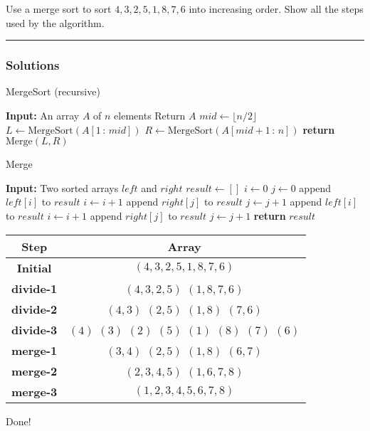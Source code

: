 \newpage
\begin{question}
Use a merge sort to sort $4,3,2,5,1,8,7,6$ into increasing order. Show all the steps used by the algorithm.
\end{question}

\par\noindent\rule{\textwidth}{0.5pt}

\subsubsection*{Solutions}

\begin{algorithm}
\caption{MergeSort (recursive)}\label{alg:cap}
\begin{algorithmic}
\State \textbf{Input:} An array $A$ of $n$ elements
    \State Return $A$
    \State $mid \gets \lfloor n/2 \rfloor$
    \State $L \gets \text{MergeSort}(A[1 \,:\,mid])$
    \State $R \gets \text{MergeSort}(A[mid+1 \,:\, n])$
    \State \textbf{return} $\text{Merge}(L, R)$
\EndIf
\end{algorithmic}
\end{algorithm}

\begin{algorithm}
\caption{Merge}
\begin{algorithmic}
    \State \textbf{Input:} Two sorted arrays $left$ and $right$
    \State $result \gets []$
    \State $i \gets 0$
    \State $j \gets 0$
            \State append $left[i]$ to $result$
            \State $i \gets i + 1$
        \Else
            \State append $right[j]$ to $result$
            \State $j \gets j + 1$
        \EndIf
    \EndWhile
        \State append $left[i]$ to $result$
        \State $i \gets i + 1$
    \EndWhile
        \State append $right[j]$ to $result$
        \State $j \gets j + 1$
    \EndWhile
    \State \textbf{return} $result$
\end{algorithmic}
\end{algorithm}
\begin{center}
\begin{tabular}{|c|c|}
    \hline
    \textbf{Step} & \textbf{Array} \\
    \hline
    \textbf{Initial} & $(4,3,2,5,1,8,7,6)$ \\
    \textbf{divide-1} & $(4,3,2,5)$ \quad $(1,8,7,6)$ \\
    \textbf{divide-2} & $(4,3)$ \quad $(2,5)$ \quad $(1,8)$ \quad $(7,6)$ \\
    \textbf{divide-3} & $(4)$ \quad $(3)$ \quad $(2)$ \quad $(5)$ \quad $(1)$ \quad $(8)$ \quad $(7)$ \quad $(6)$ \\
    \textbf{merge-1} & $(3,4)$ \quad $(2,5)$ \quad $(1,8)$ \quad $(6,7)$ \\
    \textbf{merge-2} & $(2,3,4,5)$ \quad $(1,6,7,8)$ \\
    \textbf{merge-3} & $(1,2,3,4,5,6,7,8)$ \\
    \hline
\end{tabular}
\end{center}

Done!